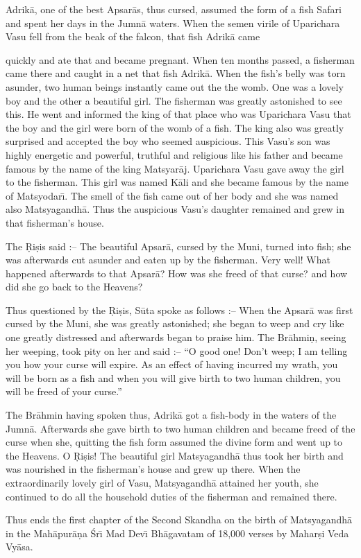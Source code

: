 Adrik\=a, one of the best Apsar\=as, thus cursed, assumed the form of a fish Safari and spent her days in the Jumn\=a waters. When the semen virile of Uparichara Vasu fell from the beak of the falcon, that fish Adrik\=a came

quickly and ate that and became pregnant. When ten months passed, a fisherman came there and caught in a net that fish Adrik\=a. When the fish's belly was torn asunder, two human beings instantly came out the the womb. One was a lovely boy and the other a beautiful girl. The fisherman was greatly astonished to see this. He went and informed the king of that place who was Uparichara Vasu that the boy and the girl were born of the womb of a fish. The king also was greatly surprised and accepted the boy who seemed auspicious. This Vasu's son was highly energetic and powerful, truthful and religious like his father and became famous by the name of the king Matsyar\=aj. Uparichara Vasu gave away the girl to the fisherman. This girl was named K\=ali and she became famous by the name of Matsyodar\={\i}. The smell of the fish came out of her body and she was named also Matsyagandh\=a. Thus the auspicious Vasu's daughter remained and grew in that fisherman's house.

The \d{R}i\d{s}is said :-- The beautiful Apsar\=a, cursed by the Muni, turned into fish; she was afterwards cut asunder and eaten up by the fisherman. Very well! What happened afterwards to that Apsar\=a? How was she freed of that curse? and how did she go back to the Heavens?

Thus questioned by the \d{R}i\d{s}is, S\=uta spoke as follows :-- When the Apsar\=a was first cursed by the Muni, she was greatly astonished; she began to weep and cry like one greatly distressed and afterwards began to praise him. The Br\=ahmi\d{n}, seeing her weeping, took pity on her and said :-- ``O good one! Don't weep; I am telling you how your curse will expire. As an effect of having incurred my wrath, you will be born as a fish and when you will give birth to two human children, you will be freed of your curse.''

The Br\=ahmin having spoken thus, Adrik\=a got a fish-body in the waters of the Jumn\=a. Afterwards she gave birth to two human children and became freed of the curse when she, quitting the fish form assumed the divine form and went up to the Heavens. O \d{R}i\d{s}is! The beautiful girl Matsyagandh\=a thus took her birth and was nourished in the fisherman's house and grew up there. When the extraordinarily lovely girl of Vasu, Matsyagandh\=a attained her youth, she continued to do all the household duties of the fisherman and remained there.

Thus ends the first chapter of the Second Skandha on the birth of Matsyagandh\=a in the Mah\=apur\=a\d{n}a \'Sr\={\i} Mad Dev\={\i} Bh\=agavatam of 18,000 verses by Mahar\d{s}i Veda Vy\=asa.



